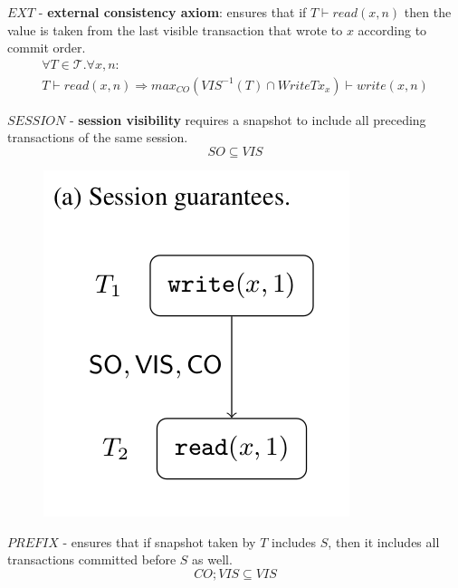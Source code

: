 \documentclass{beamer}
\begin{document}
\begin{frame}
	$EXT$ - \textbf{external consistency axiom}: ensures that if $T\vdash read(x,n)$ then the value is taken from the last visible transaction that wrote to $x$ according to commit order.
	\begin{multline*}
		\forall T \in \mathcal{T} . \forall x, n: \\
		T \vdash read(x,n) \Rightarrow
		max_{CO}\left( VIS^{-1}\left( T \right) \cap WriteTx_x \right) \vdash write(x,n)
	\end{multline*}
\end{frame}

\begin{frame}
	$SESSION$ - \textbf{session visibility} requires a snapshot to include all preceding transactions of the same session.
	$$ SO \subseteq VIS $$
\end{frame}

\begin{frame}
	\begin{figure}
		\includegraphics[scale=0.3]{fig2a}
	\end{figure}
\end{frame}

\begin{frame}
	$PREFIX$ - ensures that if snapshot taken by $T$ includes $S$, then it includes all transactions committed before $S$ as well.
	$$ CO; VIS \subseteq VIS $$
\end{frame}
\end{document}
